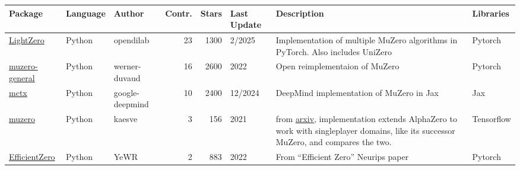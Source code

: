\documentclass[12pt]{article}
\begin{document}
\begin{table}
    \centering
    \begin{adjustbox}{width=\textwidth}
    \begin{tabular}{lllrrlp{6cm}l}
        \toprule
        Package & Language &           Author &  Contr. &  Stars & Last Update &                                                                                                                                                                                                                                                                                    Description &  Libraries \\
        \midrule
        \href{https://github.com/opendilab/LightZero}{LightZero} &   Python &        opendilab &            23 &   1300 &      2/2025 &                                                                                                                                                                                                                 Implementation of multiple MuZero algorithms in PyTorch. Also includes UniZero &    Pytorch \\
        \href{https://github.com/werner-duvaud/muzero-general}{muzero-general} &   Python &    werner-duvaud &            16 &   2600 &        2022 &                                                                                                                                                                                                                                                                 Open reimplementaion of MuZero &    Pytorch \\
        \href{https://github.com/google-deepmind/mctx}{mctx} &   Python &  google-deepmind &            10 &   2400 &     12/2024 &                                                                                                                                                                                                                                                       DeepMind implementation of MuZero in Jax &        Jax \\
        \href{https://github.com/kaesve/muzero}{muzero} &   Python &           kaesve &             3 &    156 &        2021 & from \href{https://arxiv.org/abs/2102.12924}{arxiv}, implementation extends AlphaZero to work with singleplayer domains, like its successor MuZero, and compares the two. & Tensorflow \\
        \href{https://github.com/YeWR/EfficientZero}{EfficientZero} &   Python &             YeWR &             2 &    883 &        2022 &                                                                                                                                                                                                                                                          From “Efficient Zero” Neurips paper &    Pytorch \\

\end{tabular}
\end{adjustbox}
\end{table}
\end{document}
